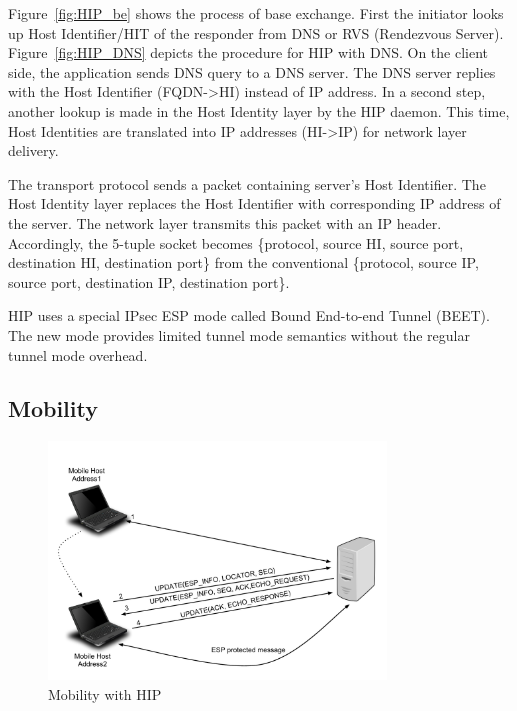 Figure~\ref{fig:HIP_be} shows the process of base exchange. First the initiator looks up Host Identifier/HIT of the responder from DNS or RVS (Rendezvous Server). Figure~\ref{fig:HIP_DNS} depicts the procedure for HIP with DNS. On the client side, the application sends DNS query to a DNS server. The DNS server replies with the Host Identifier (FQDN-\textgreater HI) instead of IP address. In a second step, another lookup is made in the Host Identity layer by the HIP daemon. This time, Host Identities are translated into IP addresses (HI-\textgreater IP) for network layer delivery.

The transport protocol sends a packet containing server's Host Identifier. The Host Identity layer replaces the Host Identifier with corresponding IP address of the server. The network layer transmits this packet with an IP header. Accordingly, the 5-tuple socket becomes \{protocol, source HI, source port, destination HI, destination port\} from the conventional \{protocol, source IP, source port, destination IP, destination port\}. 

HIP uses a special IPsec ESP mode called Bound End-to-end Tunnel (BEET). The new mode provides limited tunnel mode semantics without the regular tunnel mode overhead.

\subsection{Mobility}
\begin{figure}[htb!]
\centering
\includegraphics[width=0.8\textwidth]{images/HIP_figure4}
\caption{Mobility with HIP}
\label{fig:HIP_mob}
\end{figure}

